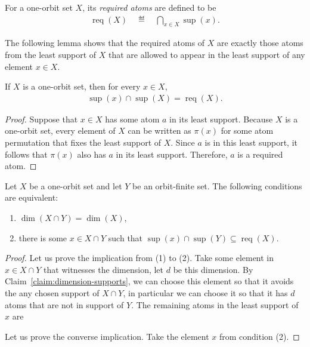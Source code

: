 \newcommand{\req}{\operatorname{req}}


\begin{definition}
    For a one-orbit set $X$, its \emph{required atoms} are defined to be 
    \begin{align*}
    \req(X) 
    \quad \eqdef \quad 
    \bigcap_{x \in X} \sup(x).
    \end{align*}
\end{definition}

The following lemma shows that the required atoms of $X$ are exactly those atoms from the least support of $X$ that are allowed to appear in the least support of any element $x \in X$.
\begin{lemma}
    If $X$ is a one-orbit set, then for every $x \in X$, 
    \begin{align*}
    \sup(x) \cap \sup(X) = \req(X).
    \end{align*}
\end{lemma}
\begin{proof}
    Suppose that $x \in X$ has some atom $a$ in its least support. Because $X$ is a one-orbit set, every element of $X$ can be written as  $\pi(x)$ for some atom permutation that fixes the least support of $X$. Since $a$ is in this least support, it follows that $\pi(x)$ also has $a$ in its least support. Therefore, $a$ is a required atom. 
\end{proof}

\begin{lemma}\label{lem:dimension-fresh-elements}
    Let $X$ be a one-orbit set and let $Y$ be an orbit-finite set. The following conditions are equivalent: 
    \begin{enumerate}
        \item $\dim(X \cap Y) = \dim(X)$,
        \item there is some $x \in X \cap Y$ such that $\sup(x) \cap \sup(Y) \subseteq  \req(X)$.
    \end{enumerate}
\end{lemma}
\begin{proof}
    Let us prove the implication from (1) to (2).  Take some element in $x \in X \cap Y$ that witnesses the dimension, let $d$ be this dimension. By Claim~\ref{claim:dimension-supports}, we can choose this element so that it avoids the any chosen support of $X \cap Y$, in particular we can choose it so that it has $d$ atoms that are not in support of $Y$. The remaining atoms in the least support of $x$ are 

    Let us prove the converse implication. Take the element $x$ from condition (2). 
\end{proof}




